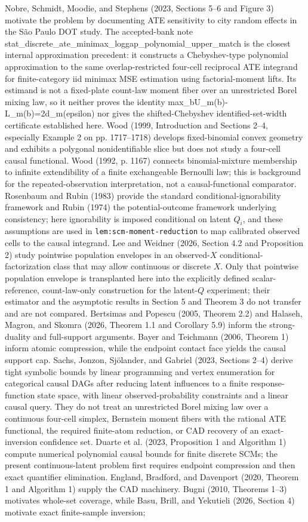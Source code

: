 \documentclass{article}
\begin{document}
Nobre, Schmidt, Moodie, and Stephens (2023, Sections 5--6 and Figure 3) motivate the problem by documenting ATE sensitivity to city random effects in the São Paulo DOT study. The accepted-bank note stat\_discrete\_ate\_minimax\_loggap\_polynomial\_upper\_match is the closest internal approximation precedent: it constructs a Chebyshev-type polynomial approximation to the same overlap-restricted four-cell reciprocal ATE integrand for finite-category iid minimax MSE estimation using factorial-moment lifts. Its estimand is not a fixed-plate count-law moment fiber over an unrestricted Borel mixing law, so it neither proves the identity max\_b{U\_m(b)-L\_m(b)}=2d\_m(epsilon) nor gives the shifted-Chebyshev identified-set-width certificate established here. Wood (1999, Introduction and Sections 2--4, especially Example 2 on pp. 1717--1718) develops fixed-binomial convex geometry and exhibits a polygonal nonidentifiable slice but does not study a four-cell causal functional. Wood (1992, p. 1167) connects binomial-mixture membership to infinite extendibility of a finite exchangeable Bernoulli law; this is background for the repeated-observation interpretation, not a causal-functional comparator. Rosenbaum and Rubin (1983) provide the standard conditional-ignorability framework and Rubin (1974) the potential-outcome framework underlying consistency; here ignorability is imposed conditional on latent \(Q_i\), and these assumptions are used in \texttt{lem:scm-moment-reduction} to map calibrated observed cells to the causal integrand. Lee and Weidner (2026, Section 4.2 and Proposition 2) study pointwise population envelopes in an observed-\(X\) conditional-factorization class that may allow continuous or discrete \(X\). Only that pointwise population envelope is transplanted here into the explicitly defined scalar-reference, count-law-only construction for the latent-\(Q\) experiment; their estimator and the asymptotic results in Section 5 and Theorem 3 do not transfer and are not compared. Bertsimas and Popescu (2005, Theorem 2.2) and Halaseh, Magron, and Skomra (2026, Theorem 1.1 and Corollary 5.9) inform the strong-duality and full-support arguments. Bayer and Teichmann (2006, Theorem 1) inform atomic compression, while the endpoint contact face yields the causal support cap. Sachs, Jonzon, Sjölander, and Gabriel (2023, Sections 2--4) derive tight symbolic bounds by linear programming and vertex enumeration for categorical causal DAGs after reducing latent influences to a finite response-function state space, with linear observed-probability constraints and a linear causal query. They do not treat an unrestricted Borel mixing law over a continuous four-cell simplex, Bernstein moment fibers with the rational ATE functional, the required finite-atom reduction, or CAD recovery of an exact-inversion confidence set. Duarte et al. (2023, Proposition 1 and Algorithm 1) compute numerical polynomial causal bounds for finite discrete SCMs; the present continuous-latent problem first requires endpoint compression and then exact quantifier elimination. England, Bradford, and Davenport (2020, Theorem 1 and Algorithm 1) supply the CAD machinery. Bugni (2010, Theorems 1--3) motivates whole-set coverage, while Basu, Brill, and Yekutieli (2026, Section 4) motivate exact finite-sample inversion; 
\end{document}
